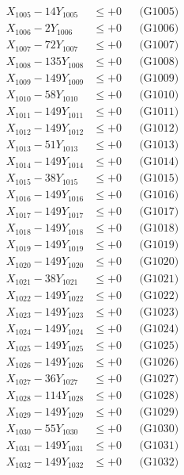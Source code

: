 \documentclass[a4paper,10pt]{article}
\begin{document}
{\begin{align}
X_{1005} - 14Y_{1005} &\leq +0 && \text{(G1005)} \\
X_{1006} - 2Y_{1006} &\leq +0 && \text{(G1006)} \\
X_{1007} - 72Y_{1007} &\leq +0 && \text{(G1007)} \\
X_{1008} - 135Y_{1008} &\leq +0 && \text{(G1008)} \\
X_{1009} - 149Y_{1009} &\leq +0 && \text{(G1009)} \\
X_{1010} - 58Y_{1010} &\leq +0 && \text{(G1010)} \\
\allowbreak
X_{1011} - 149Y_{1011} &\leq +0 && \text{(G1011)} \\
X_{1012} - 149Y_{1012} &\leq +0 && \text{(G1012)} \\
X_{1013} - 51Y_{1013} &\leq +0 && \text{(G1013)} \\
X_{1014} - 149Y_{1014} &\leq +0 && \text{(G1014)} \\
X_{1015} - 38Y_{1015} &\leq +0 && \text{(G1015)} \\
X_{1016} - 149Y_{1016} &\leq +0 && \text{(G1016)} \\
X_{1017} - 149Y_{1017} &\leq +0 && \text{(G1017)} \\
X_{1018} - 149Y_{1018} &\leq +0 && \text{(G1018)} \\
X_{1019} - 149Y_{1019} &\leq +0 && \text{(G1019)} \\
X_{1020} - 149Y_{1020} &\leq +0 && \text{(G1020)} \\
\allowbreak
X_{1021} - 38Y_{1021} &\leq +0 && \text{(G1021)} \\
X_{1022} - 149Y_{1022} &\leq +0 && \text{(G1022)} \\
X_{1023} - 149Y_{1023} &\leq +0 && \text{(G1023)} \\
X_{1024} - 149Y_{1024} &\leq +0 && \text{(G1024)} \\
X_{1025} - 149Y_{1025} &\leq +0 && \text{(G1025)} \\
X_{1026} - 149Y_{1026} &\leq +0 && \text{(G1026)} \\
X_{1027} - 36Y_{1027} &\leq +0 && \text{(G1027)} \\
X_{1028} - 114Y_{1028} &\leq +0 && \text{(G1028)} \\
X_{1029} - 149Y_{1029} &\leq +0 && \text{(G1029)} \\
X_{1030} - 55Y_{1030} &\leq +0 && \text{(G1030)} \\
\allowbreak
X_{1031} - 149Y_{1031} &\leq +0 && \text{(G1031)} \\
X_{1032} - 149Y_{1032} &\leq +0 && \text{(G1032)} \\

\end{align}}
\end{document}
